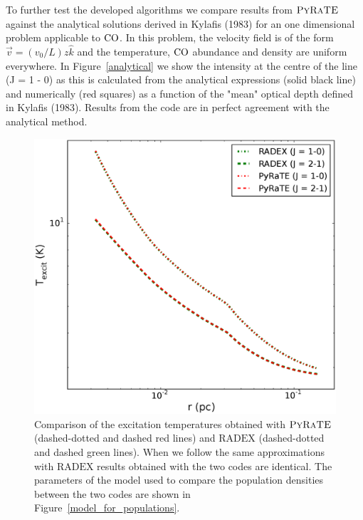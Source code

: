 \documentclass{mn2e}
\begin{document}
To further test the developed algorithms we compare results from $\textsc{PyRaTE}$ against the analytical solutions derived in Kylafis (1983) for an one dimensional problem applicable to $\rm{CO}$. In this problem, the velocity field is of the form $\vec{v}=(v_0/L)z\hat{k}$ and the temperature, $\rm{CO}$ abundance and density are uniform everywhere. In Figure~\ref{analytical} we show the intensity at the centre of the line (J = 1 - 0) as this is calculated from the analytical expressions (solid black line) and numerically (red squares) as a function of the "mean" optical depth defined in Kylafis (1983). Results from the code are in perfect agreement with the analytical method.

\begin{figure}
\includegraphics[width=1.0\columnwidth, clip]{poprat_comparison.eps}
\caption{Comparison of the excitation temperatures obtained with $\textsc{PyRaTE}$ (dashed-dotted and dashed red lines) and $\text{RADEX}$ (dashed-dotted and dashed green lines). When we follow the same approximations with $\text{RADEX}$ results obtained with the two codes are identical. The parameters of the model used to compare the population densities between the two codes are shown in Figure~\ref{model_for_populations}.
\label{poprat_comparison}}
\end{figure}
\end{document}
